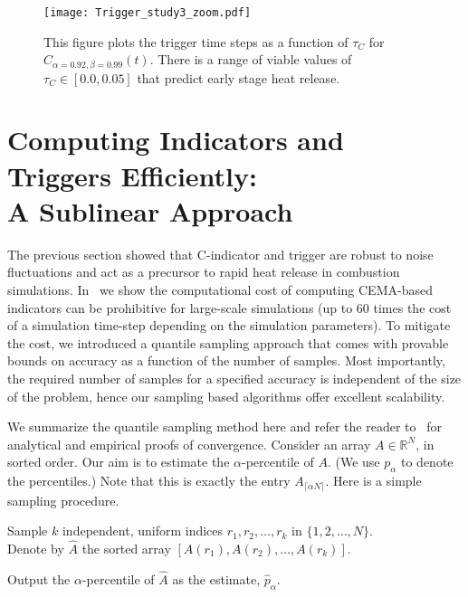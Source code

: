\documentclass{sig-alternate}
\newcommand{\RR}{\mathbb{R}}
\newcommand{\cmetric}{C}
\newcommand{\pt}{{p}}
\newcommand{\samp}{k}
\newcommand{\thresh}{\tau}
\begin{document}
\begin{figure}[t]
\centering
\texttt{[image: Trigger\_study3\_zoom.pdf]}
\caption{\label{fig:Triggers_thresh} This figure plots the trigger time steps as a function of
$\thresh_{\cmetric}$ for $\cmetric_{\alpha=0.92, \beta=0.99}(t)$.
There is a range of viable values of $\thresh_{\cmetric} \in [0.0, 0.05]$
that predict early stage heat release.
}
\end{figure}

\section{Computing Indicators and \\Triggers Efficiently: \\A Sublinear Approach}
\label{sec:sample} 
The previous section showed that \cmetric-indicator and
trigger are robust to noise fluctuations and act as a precursor to rapid heat
release in combustion simulations. In~\cite{cema-insitu} we show 
the computational cost of computing CEMA-based indicators can be prohibitive for large-scale
simulations (up to 60 times the cost of a simulation time-step depending on the
simulation parameters).  
To mitigate the cost, we introduced a quantile sampling approach that comes with
provable bounds on accuracy as a function of the number of samples.  Most
importantly,  the required number of samples for a specified accuracy is
independent of  the size of the problem, hence our sampling based algorithms
offer  excellent scalability. 

We summarize the quantile sampling method here and refer the reader
to~\cite{cema-insitu} for analytical and empirical proofs of convergence. Consider an array $A \in \RR^N$, in sorted order.
Our aim is to estimate the $\alpha$-percentile of $A$. (We use $\pt_\alpha$ to denote
the percentiles.) Note that this 
is exactly the entry $A_{\lceil \alpha N \rceil}$. Here is a simple sampling procedure. \\[-1ex]
\begin{compactenum}
	\item Sample $\samp$ independent, uniform indices $r_1, r_2, \ldots, r_\samp$
	in $\{1,2,\ldots,N\}$. \\ Denote by $\widehat{A}$ the sorted array $[A(r_1),A(r_2),\ldots,A(r_\samp)]$.
	\item Output the $\alpha$-percentile of $\widehat{A}$ as the estimate, $\widehat{\pt}_\alpha$. \\[-1ex]
\end{compactenum}
\end{document}
